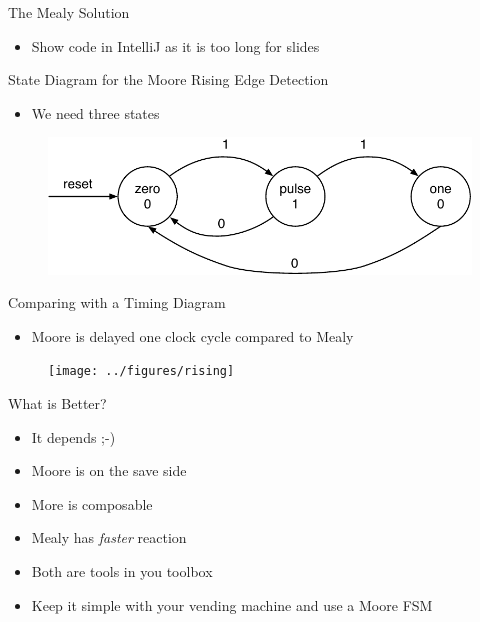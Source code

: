 \begin{frame}[fragile]{The Mealy Solution}
\begin{itemize}
\item Show code in IntelliJ as it is too long for slides
\end{itemize}
\end{frame}

\begin{frame}[fragile]{State Diagram for the Moore Rising Edge Detection}
\begin{itemize}
\item We need three states
\end{itemize}
\begin{figure}
  \includegraphics[scale=\scale]{../figures/state-diag-rising-moore}
\end{figure}
\end{frame}

\begin{frame}[fragile]{Comparing with a Timing Diagram}
\begin{itemize}
\item Moore is delayed one clock cycle compared to Mealy
\end{itemize}
\begin{figure}
  \texttt{[image: ../figures/rising]}
\end{figure}
\end{frame}

\begin{frame}[fragile]{What is Better?}
\begin{itemize}
\item It depends ;-)
\item Moore is on the save side
\item More is composable
\item Mealy has \emph{faster} reaction
\item Both are tools in you toolbox
\item Keep it simple with your vending machine and use a Moore FSM
\end{itemize}
\end{frame}

